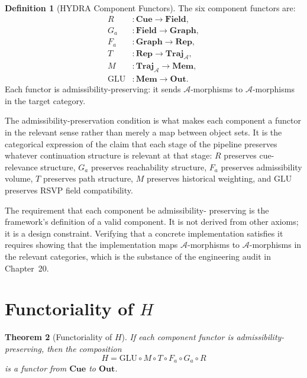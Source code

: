 \documentclass[12pt, oneside]{book}
\theoremstyle{flyxion}
\newtheorem{theorem}{Theorem}[chapter]
\theoremstyle{definition}
\newtheorem{definition}[theorem]{Definition}
\begin{document}
\begin{definition}[HYDRA Component Functors]
The six component functors are:
\begin{align*}
R &: \mathbf{Cue} \to \mathbf{Field}, \\
G_a &: \mathbf{Field} \to \mathbf{Graph}, \\
F_a &: \mathbf{Graph} \to \mathbf{Rep}, \\
T &: \mathbf{Rep} \to \mathbf{Traj}_{\mathcal{A}}, \\
M &: \mathbf{Traj}_{\mathcal{A}} \to \mathbf{Mem}, \\
\mathrm{GLU} &: \mathbf{Mem} \to \mathbf{Out}.
\end{align*}
Each functor is admissibility-preserving: it sends
$\mathcal{A}$-morphisms to $\mathcal{A}$-morphisms in
the target category.
\end{definition}

The admissibility-preservation condition is what makes
each component a functor in the relevant sense rather
than merely a map between object sets. It is the
categorical expression of the claim that each stage of
the pipeline preserves whatever continuation structure
is relevant at that stage: $R$ preserves cue-relevance
structure, $G_a$ preserves reachability structure,
$F_a$ preserves admissibility volume, $T$ preserves
path structure, $M$ preserves historical weighting, and
$\mathrm{GLU}$ preserves RSVP field compatibility.

The requirement that each component be admissibility-
preserving is the framework's definition of a valid
component. It is not derived from other axioms; it is
a design constraint. Verifying that a concrete
implementation satisfies it requires showing that the
implementation maps $\mathcal{A}$-morphisms to
$\mathcal{A}$-morphisms in the relevant categories,
which is the substance of the engineering audit in
Chapter~20.

\section{Functoriality of $H$}

\begin{theorem}[Functoriality of $H$]
\label{thm:H_functor}
If each component functor is admissibility-preserving,
then the composition
\[
H = \mathrm{GLU} \circ M \circ T \circ F_a \circ G_a
    \circ R
\]
is a functor from $\mathbf{Cue}$ to $\mathbf{Out}$.
\end{theorem}
\end{document}
